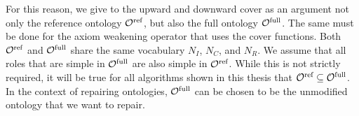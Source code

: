 For this reason, we give to the upward and downward cover as an argument not only the reference ontology ${\mathcal{O}^\textnormal{ref}}$, but also the full ontology ${\mathcal{O}^\textnormal{full}}$. The same must be done for the axiom weakening operator that uses the cover functions. Both ${\mathcal{O}^\textnormal{ref}}$ and ${\mathcal{O}^\textnormal{full}}$ share the same vocabulary $N_I$, $N_C$, and $N_R$. We assume that all roles that are simple in ${\mathcal{O}^\textnormal{full}}$ are also simple in ${\mathcal{O}^\textnormal{ref}}$. While this is not strictly required, it will be true for all algorithms shown in this thesis that ${\mathcal{O}^\textnormal{ref}} \subseteq {\mathcal{O}^\textnormal{full}}$. In the context of repairing ontologies, ${\mathcal{O}^\textnormal{full}}$ can be chosen to be the unmodified ontology that we want to repair.

